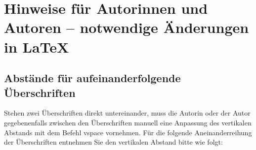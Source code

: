\chapter{Hinweise für Autorinnen und Autoren -- notwendige Änderungen in \LaTeX}
\label{chap:Hinweise}





\section{Abstände für aufeinanderfolgende Überschriften}
\label{sec:Abstaende fuer aufeinanderfolgende Ueberschriften}
Stehen zwei Überschriften direkt untereinander, muss die Autorin oder der Autor gegebenenfalls zwischen den Überschriften manuell eine Anpassung des vertikalen Abstands mit dem Befehl \glqq vspace\grqq{} vornehmen. Für die folgende Aneinanderreihung der Überschriften entnehmen Sie den vertikalen Abstand bitte wie folgt:

